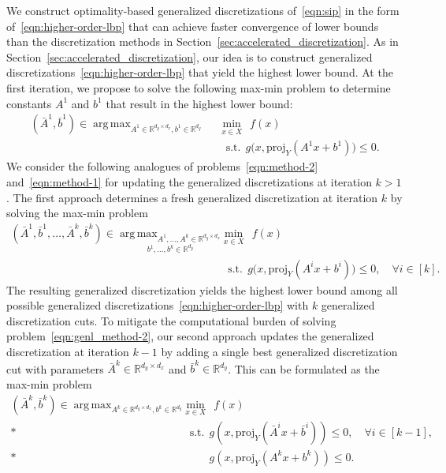 \documentclass{article}
\DeclareMathOperator*{\argmax}{arg\,max}
\newcommand{\uset}[2]{\ensuremath{\underset{#1}{#2}}}
\newcommand{\R}{\mathbb{R}}
\newcommand{\1}[1]{\mathds{1}\left[#1\right]}
\begin{document}
We construct optimality-based generalized discretizations of~\eqref{eqn:sip} in the form of~\eqref{eqn:higher-order-lbp} that can achieve faster convergence of lower bounds than the discretization methods in Section~\ref{sec:accelerated_discretization}.
As in Section~\ref{sec:accelerated_discretization}, our idea is to construct generalized discretizations~\eqref{eqn:higher-order-lbp} that yield the highest lower bound.
At the first iteration, we propose to solve the following max-min problem to determine constants $A^1$ and $b^1$ that result in the highest lower bound:
\begin{align}
\label{eqn:genl_max_min_iter1}
(\bar{A}^1, \bar{b}^1) \in \argmax_{A^1 \in \R^{d_y \times d_x}, b^1 \in \R^{d_y}} \:\: & \min_{x \in X} \:\: f(x) \\
& \:\:\:\text{s.t.} \:\: g\bigl(x,\text{proj}_Y(A^1 x + b^1)\bigr) \leq 0. \nonumber
\end{align}
We consider the following analogues of problems~\eqref{eqn:method-2} and~\eqref{eqn:method-1} for updating the generalized discretizations at iteration $k > 1$.
The first approach determines a fresh generalized discretization at iteration $k$ by solving the max-min problem
{
\begin{align}
\label{eqn:genl_method-2}
(\bar{A}^1,\bar{b}^1,\dots,\bar{A}^k,\bar{b}^k) \in \uset{b^1,\dots,b^k \in \R^{d_y}}{\argmax_{A^1,\dots,A^k \in \R^{d_y \times d_x}}} \:\: & \min_{x \in X} \:\: f(x) \\
& \:\:\:\text{s.t.} \:\: g\bigl(x,\text{proj}_Y(A^i x + b^i)\bigr) \leq 0, \quad \forall i \in [k]. \nonumber
\end{align}
}%
The resulting generalized discretization yields the highest lower bound among all possible generalized discretizations~\eqref{eqn:higher-order-lbp} with $k$ generalized discretization cuts.
To mitigate the computational burden of solving problem~\eqref{eqn:genl_method-2}, our second approach updates the generalized discretization at iteration $k-1$ by adding a single best generalized discretization cut with parameters $\bar{A}^k \in \R^{d_y \times d_x}$ and $\bar{b}^k \in \R^{d_y}$.
This can be formulated as the max-min problem
{
\begin{align}
\label{eqn:genl_method-1}
(\bar{A}^k, \bar{b}^k) \in \argmax_{A^k \in \R^{d_y \times d_x}, b^k \in \R^{d_y}} \:\: & \min_{x \in X} \:\: f(x) \\*
& \:\:\:\text{s.t.} \:\: g(x,\text{proj}_Y(\bar{A}^i x + \bar{b}^i)) \leq 0, \quad \forall i \in [k-1], \nonumber \\*
& \quad\quad\:\: g(x,\text{proj}_Y(A^k x + b^k)) \leq 0. \nonumber
\end{align}%
}%
\end{document}
